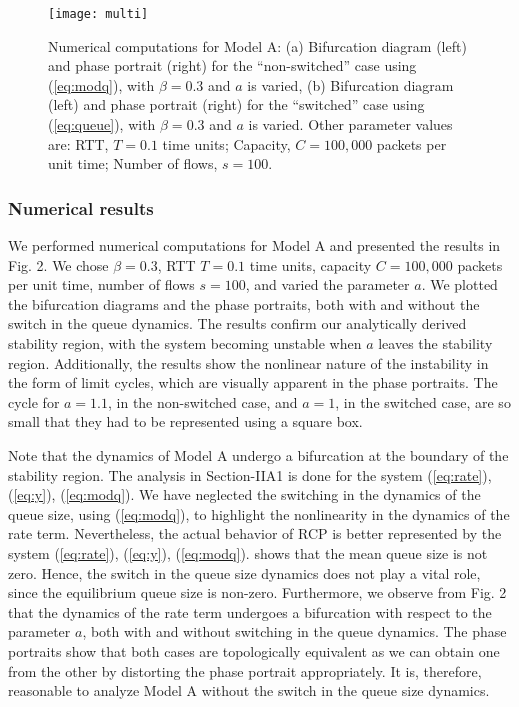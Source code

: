 \documentclass[conference]{IEEEtran}
\begin{document}
\begin{figure*}
\centering
{}



\texttt{[image: multi]}
\caption{Numerical computations for Model A: (a) Bifurcation diagram (left) and phase portrait 
(right) for the ``non-switched'' case using (\ref{eq:modq}), with $\beta = 0.3$ and $a$ is varied, (b) Bifurcation diagram 
(left) and phase portrait (right) for the ``switched'' case using (\ref{eq:queue}), with $\beta = 0.3$ and $a$ is 
varied. Other parameter values are: RTT, $T = 0.1$ time units; Capacity, $C = 100,000$ packets per 
unit time; Number of flows, $s = 100$.}
\label{multiplot}
\end{figure*}

\subsubsection{Numerical results}
We performed numerical computations for Model A and presented the results in Fig. 2.
We chose $\beta = 0.3$, RTT $T = 0.1$ time units,
capacity $C = 100,000$ packets per unit time, number of flows $s = 100$, and varied the parameter $a$. We plotted the bifurcation
diagrams and the phase portraits, both with and without the switch in the queue dynamics. The results confirm our analytically derived stability region, with the system becoming unstable when $a$ leaves the stability region. Additionally, the results show the nonlinear nature of the instability in the form of limit cycles, which are visually apparent in the phase portraits. The cycle for $a = 1.1$, in the non-switched case, and
$a = 1$, in the switched case, are so small that they had to be represented using a square box.

Note that the dynamics of Model A undergo a bifurcation at the boundary of the stability region.
The analysis in Section-IIA1 is done for the system (\ref{eq:rate}), (\ref{eq:y}), (\ref{eq:modq}).
We have neglected the switching in the dynamics of the queue size, using (\ref{eq:modq}), to highlight the nonlinearity in the
dynamics of the rate term. Nevertheless, the actual behavior of RCP is better
represented by the system (\ref{eq:rate}), (\ref{eq:y}), (\ref{eq:modq}). \cite[Fig.~5]{krv}
shows that the mean queue size is not zero.    
Hence, the switch in the queue size dynamics does not play a vital role, since the equilibrium queue size is non-zero.
Furthermore, we observe from Fig. 2 that the dynamics of the rate term undergoes a bifurcation with respect to the parameter $a$, both with and without switching in the queue dynamics. The phase
portraits show that both cases are topologically equivalent as we can
obtain one from the other by distorting the phase portrait appropriately. It is,
therefore, reasonable to analyze Model A without the switch in the queue size dynamics.
\end{document}
